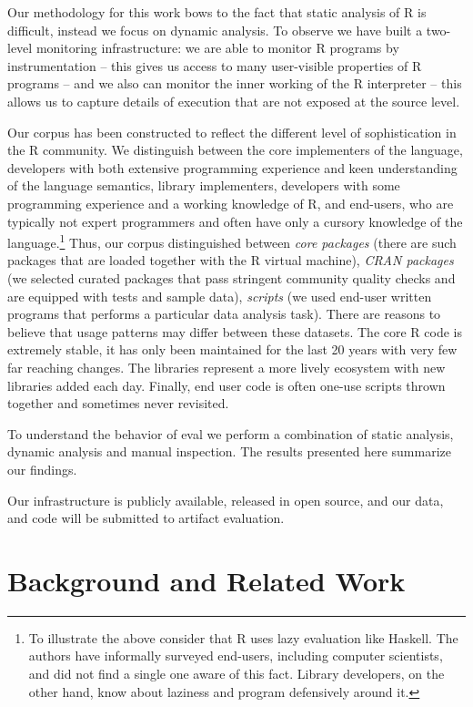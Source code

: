 \documentclass[conference]{IEEEtran}
\begin{document}
Our methodology for this work bows to the fact that static analysis of R is
difficult, instead we focus on dynamic analysis. To observe \eval we have
built a two-level monitoring infrastructure: we are able to monitor R
programs by instrumentation -- this gives us access to many user-visible
properties of R programs -- and we also can monitor the inner working of the
R interpreter -- this allows us to capture details of execution that are not
exposed at the source level.

Our corpus has been constructed to reflect the different level of
sophistication in the R community. We distinguish between the core
implementers of the language, developers with both extensive programming
experience and keen understanding of the language semantics, library
implementers, developers with some programming experience and a working
knowledge of R, and end-users, who are typically not expert programmers and
often have only a cursory knowledge of the language.\footnote{To illustrate
  the above consider that R uses lazy evaluation like Haskell. The authors
  have informally surveyed end-users, including computer scientists, and did
  not find a single one aware of this fact. Library developers, on the other
  hand, know about laziness and program defensively around it.}  Thus, our
corpus distinguished between \emph{core packages} (there are  such
packages that are loaded together with the R virtual machine), \emph{CRAN
  packages} (we selected  curated packages that pass stringent
community quality checks and are equipped with tests and sample data),
\emph{scripts} (we used  end-user written programs that performs a
particular data analysis task).  There are reasons to believe that \eval
usage patterns may differ between these datasets. The core R code is
extremely stable, it has only been maintained for the last 20 years with
very few far reaching changes. The libraries represent a more lively
ecosystem with new libraries added each day.  Finally, end user code is
often one-use scripts thrown together and sometimes never revisited.


To understand the behavior of eval we perform a combination of static
analysis, dynamic analysis and manual inspection. The results presented
here summarize our findings.

Our infrastructure is publicly available, released in open source, and our
data, and code will be submitted to artifact evaluation.


\section{Background and Related Work}
\end{document}
